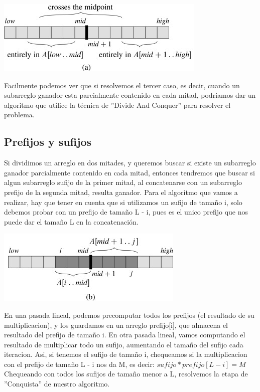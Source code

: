 \includegraphics{img/subarrays-casos.jpg}

Facilmente podemos ver que si resolvemos el tercer caso, es decir, cuando un subarreglo
ganador esta parcialmente contenido en cada mitad, podriamos dar un algoritmo
que utilice la técnica de ''Divide And Conquer'' para resolver el problema.

\subsection{Prefijos y sufijos}
Si dividimos un arreglo en dos mitades, y queremos buscar si existe un subarreglo ganador
parcialmente contenido en cada mitad, entonces tendremos que buscar si algun subarreglo
sufijo de la primer mitad, al concatenarse con un subarreglo prefijo de la segunda mitad,
resulta ganador.
Para el algoritmo que vamos a realizar, hay que tener en cuenta que si utilizamos un
sufijo de tamaño i, solo debemos probar con un prefijo de tamaño L - i, pues es el unico prefijo
que nos puede dar el tamaño L en la concatenación.

\includegraphics{img/subarrays-crossmid.jpg}

En una pasada lineal, podemos precomputar todos los prefijos (el resultado de su multiplicacion),
y los guardamos en un arreglo prefijo[i], que almacena el resultado del prefijo de tamaño i.
\newline
En otra pasada lineal, vamos computando el resultado de multiplicar todo un sufijo, aumentando
el tamaño del sufijo cada iteracion. Asi, si tenemos el sufijo de tamaño i, chequeamos si
la multiplicacion con el prefijo de tamaño L - i nos da M, es decir:
\newline
$sufijo * prefijo[L - i] = M$
\newline
Chequeando con todos los sufijos de tamaño menor a L, resolvemos la etapa de ''Conquista'' de nuestro
algoritmo.

